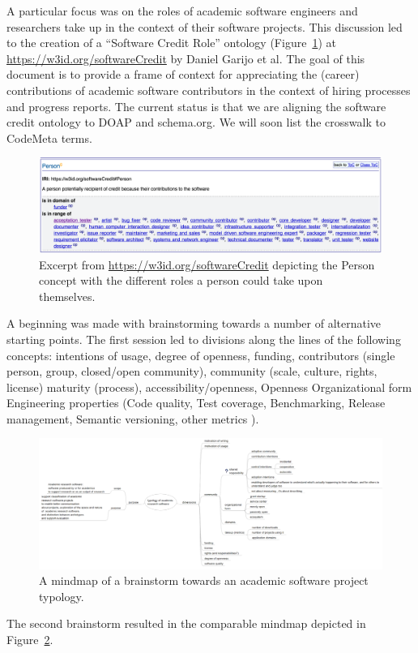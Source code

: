 \documentclass[a4paper,UKenglish]{dagrep}
\begin{document}
A particular focus was on the roles of academic software engineers and researchers take up in the context of their software projects. This discussion led to the creation of a ``Software Credit Role'' ontology (Figure~\ref{fig:credits}) at \url{https://w3id.org/softwareCredit} by Daniel Garijo et al. The goal of this document is to provide a frame of context for appreciating the (career) contributions of academic software contributors in the context of hiring processes and progress reports. The current status is that we are aligning the software credit ontology to DOAP and schema.org. We will soon list the crosswalk to CodeMeta terms.

\begin{figure}[t]
\includegraphics[width=\textwidth]{credits}	
\caption{Excerpt from \url{https://w3id.org/softwareCredit} depicting the Person concept with the different roles a person could take upon themselves.\label{fig:credits}}
\end{figure}

A beginning was made with brainstorming towards a number of alternative starting points. The first session led to divisions along the lines of the following concepts: intentions of usage, 
degree of openness,
funding,
contributors (single person, group, closed/open community),
community (scale, culture, rights, license)
maturity (process),
accessibility/openness,
Openness
Organizational form
Engineering properties
(Code quality,
Test coverage,
Benchmarking,
Release management,
Semantic versioning,
other metrics
).

\begin{figure}[t]
\includegraphics[width=\textwidth]{ontologymap}	
\caption{A mindmap of a brainstorm towards an academic software project typology.\label{fig:ontologymap}}
\end{figure}
The second brainstorm resulted in the comparable mindmap depicted in Figure~\ref{fig:ontologymap}.
\end{document}
